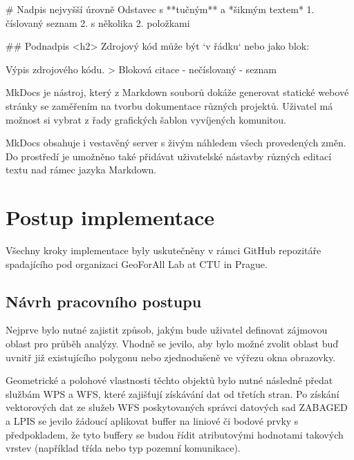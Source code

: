 \documentclass[a4paper,oneside,12pt]{book}
\begin{document}
\begin{pythoncode}[style=mypython, caption={Ukázka Markdown syntaxe},label={kod:md}]
# Nadpis nejvyšší úrovně
Odstavec s **tučným** a *šikmým textem*
1. číslovaný seznam
2. s několika
2. položkami

## Podnadpis <h2>
Zdrojový kód může být `v řádku` nebo jako blok:

  Výpis zdrojového kódu.
> Bloková citace
- nečíslovaný
- seznam
\end{pythoncode}

\hspace{10mm} MkDocs je nástroj, který z Markdown souborů dokáže generovat statické webové stránky se zaměřením na tvorbu dokumentace různých projektů. Uživatel má možnost si vybrat z řady grafických šablon vyvíjených komunitou.

\hspace{10mm}MkDocs obsahuje i vestavěný server s živým náhledem všech provedených změn. Do prostředí je umožněno také přidávat uživatelské nástavby různých editací textu nad rámec jazyka Markdown.


\chapter{Postup implementace} \label{implementace}
\hspace{10mm}Všechny kroky implementace byly uskutečněny v rámci GitHub repozitáře spadajícího pod organizaci GeoForAll Lab at CTU in Prague.

\section{Návrh pracovního postupu} \label{workflow}
\hspace{10mm}Nejprve bylo nutné zajistit způsob, jakým bude uživatel definovat zájmovou oblast pro průběh analýzy. Vhodně se jevilo, aby bylo možné zvolit oblast buď uvnitř již existujícího polygonu nebo zjednodušeně ve výřezu okna obrazovky.

\hspace{10mm}Geometrické a polohové vlastnosti těchto objektů bylo nutné následně předat službám WPS a WFS, které zajišťují získávání dat od třetích stran. Po získání vektorových dat ze služeb WFS poskytovaných správci datových sad ZABAGED a LPIS se jevilo žádoucí aplikovat buffer na liniové či bodové prvky s předpokladem, že tyto buffery se budou řídit atributovými hodnotami takových vrstev (například třída nebo typ pozemní komunikace). 
\end{document}
